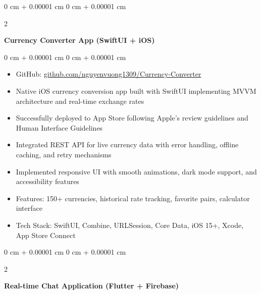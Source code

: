 \documentclass[10pt, letterpaper]{article}
\newenvironment{highlights}{
    \begin{itemize}[
        topsep=0.10 cm,
        parsep=0.10 cm,
        partopsep=0pt,
        itemsep=0pt,
        leftmargin=0 cm + 10pt
    ]
}{
    \end{itemize}
} %
\newenvironment{onecolentry}{
    \begin{adjustwidth}{
        0 cm + 0.00001 cm
    }{
        0 cm + 0.00001 cm
    }
}{
    \end{adjustwidth}
} %
\newenvironment{twocolentry}[2][]{
    \onecolentry
    \def\secondColumn{#2}
    \setcolumnwidth{\fill, 4.5 cm}
    \begin{paracol}{2}
}{
    \switchcolumn \raggedleft \secondColumn
    \end{paracol}
    \endonecolentry
} %
\begin{document}
        \vspace{0.2 cm}

        \begin{twocolentry}{
            2024
        }
            \textbf{Currency Converter App (SwiftUI + iOS)}
        \end{twocolentry}

        \vspace{0.15 cm}
        \begin{onecolentry}
            \begin{highlights}
                \item GitHub: \href{https://github.com/nguyenvuong1309/Currency-Converter}{github.com/nguyenvuong1309/Currency-Converter}
                \item Native iOS currency conversion app built with SwiftUI implementing MVVM architecture and real-time exchange rates
                \item Successfully deployed to App Store following Apple's review guidelines and Human Interface Guidelines
                \item Integrated REST API for live currency data with error handling, offline caching, and retry mechanisms
                \item Implemented responsive UI with smooth animations, dark mode support, and accessibility features
                \item Features: 150+ currencies, historical rate tracking, favorite pairs, calculator interface
                \item Tech Stack: SwiftUI, Combine, URLSession, Core Data, iOS 15+, Xcode, App Store Connect
            \end{highlights}
        \end{onecolentry}

        \vspace{0.2 cm}

        \begin{twocolentry}{
            2024
        }
            \textbf{Real-time Chat Application (Flutter + Firebase)}
        \end{twocolentry}
\end{document}
